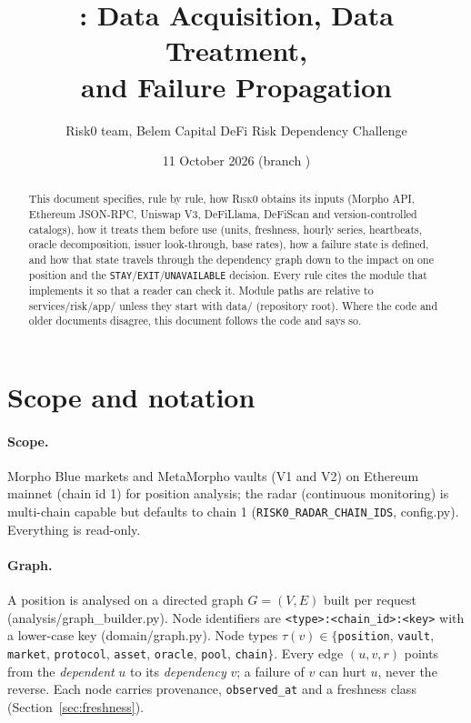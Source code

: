 \documentclass[11pt,a4paper]{article}
\title{\RiskZero{}: Data Acquisition, Data Treatment,\\ and Failure Propagation}
\author{Risk0 team, Belem Capital DeFi Risk Dependency Challenge}
\date{11 October 2026 (branch \code{main})}
\newcommand{\RiskZero}{\textsc{Risk0}}
\newcommand{\code}[1]{\texttt{#1}}
\newcommand{\src}[1]{\textsf{\small #1}}
\begin{document}
\maketitle

\begin{abstract}
This document specifies, rule by rule, how \RiskZero{} obtains its inputs (Morpho
API, Ethereum JSON-RPC, Uniswap V3, DeFiLlama, DeFiScan and version-controlled
catalogs), how it treats them before use (units, freshness, hourly series,
heartbeats, oracle decomposition, issuer look-through, base rates), how a failure
state is defined, and how that state travels through the dependency graph down to
the impact on one position and the \code{STAY}/\code{EXIT}/\code{UNAVAILABLE}
decision. Every rule cites the module that implements it so that a reader can
check it. Module paths are relative to \src{services/risk/app/} unless they start
with \src{data/} (repository root). Where the code and older documents disagree,
this document follows the code and says so.
\end{abstract}

\tableofcontents

\section{Scope and notation}

\paragraph{Scope.} Morpho Blue markets and MetaMorpho vaults (V1 and V2) on
Ethereum mainnet (chain id 1) for position analysis; the radar (continuous
monitoring) is multi-chain capable but defaults to chain 1
(\code{RISK0\_RADAR\_CHAIN\_IDS}, \src{config.py}). Everything is read-only.

\paragraph{Graph.} A position is analysed on a directed graph $G=(V,E)$ built per
request (\src{analysis/graph\_builder.py}). Node identifiers are
\code{<type>:<chain\_id>:<key>} with a lower-case key (\src{domain/graph.py}).
Node types $\tau(v)\in\{$\code{position}, \code{vault}, \code{market},
\code{protocol}, \code{asset}, \code{oracle}, \code{pool}, \code{chain}$\}$.
Every edge $(u,v,r)$ points from the \emph{dependent} $u$ to its
\emph{dependency} $v$; a failure of $v$ can hurt $u$, never the reverse.
Each node carries provenance, \code{observed\_at} and a freshness class
(Section~\ref{sec:freshness}).
\end{document}

